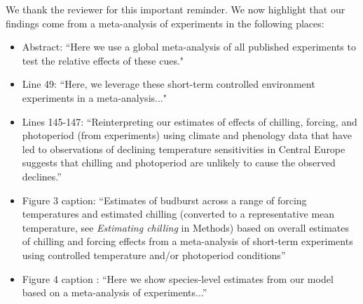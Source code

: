 \documentclass{article}
\begin{document}
\par We thank the reviewer for this important reminder. We now highlight that our findings come from a meta-analysis of experiments in the following places:
\begin{itemize}
\item Abstract: ``Here we use a global meta-analysis of all published experiments to test the relative effects of these cues."
\item Line 49: ``Here, we leverage these short-term controlled environment experiments in a meta-analysis..."
\item Lines 145-147: ``Reinterpreting our estimates of effects of chilling, forcing, and photoperiod (from experiments) using climate and phenology data that have led to observations of declining temperature sensitivities in Central Europe suggests that chilling and photoperiod are unlikely to cause the observed declines.''
\item Figure 3 caption: ``Estimates of budburst across a range of forcing temperatures and estimated chilling (converted to a representative mean temperature, see \emph{Estimating chilling} in Methods) based on overall estimates of chilling and forcing effects from a meta-analysis
of short-term experiments using controlled temperature and/or photoperiod conditions''
\item Figure 4 caption : ``Here we show species-level estimates from our model based on a meta-analysis of experiments...''
\end{itemize}
\end{document}
